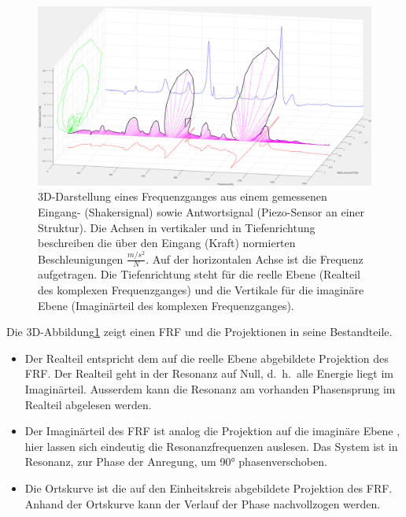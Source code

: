 \begin{figure}
	\centering
	\includegraphics[width=\textwidth]{papers/wavelets/images/4_FRF_iso.png}
	\caption{3D-Darstellung eines Frequenzganges aus einem
	gemessenen Eingang- (Shakersignal) sowie Antwortsignal
	(Piezo-Sensor an einer Struktur).
	Die Achsen in vertikaler
	und in Tiefenrichtung beschreiben die über den Eingang (Kraft)
	normierten Beschleunigungen $\frac{m/s^2}{N}$.
	Auf der horizontalen Achse ist die Frequenz aufgetragen.
	Die Tiefenrichtung steht für die reelle Ebene (Realteil des
	komplexen Frequenzganges) und die Vertikale für die imaginäre
	Ebene (Imaginärteil des komplexen Frequenzganges).}
	\label{wavelet:fig:FRF_iso}
\end{figure}

Die 3D-Abbildung\ref{wavelet:fig:FRF_iso} zeigt einen FRF und die
Projektionen in seine Bestandteile.

\begin{itemize}
	\item Der Realteil entspricht dem auf die reelle Ebene
	abgebildete Projektion des FRF. Der Realteil geht in der
	Resonanz auf Null, d.~h.~alle Energie liegt im Imaginärteil.
	Ausserdem kann die Resonanz am vorhanden Phasensprung im
	Realteil abgelesen werden.
	\item Der Imaginärteil des FRF ist analog die Projektion
	auf die imaginäre Ebene , hier lassen sich eindeutig die
	Resonanzfrequenzen auslesen.
	Das System ist in Resonanz,
	zur Phase der Anregung, um 90° phasenverschoben.
	\item Die Ortskurve ist die auf den Einheitskreis abgebildete
	Projektion des FRF.
	Anhand der Ortskurve kann der Verlauf
	der Phase nachvollzogen werden.
\end{itemize}

